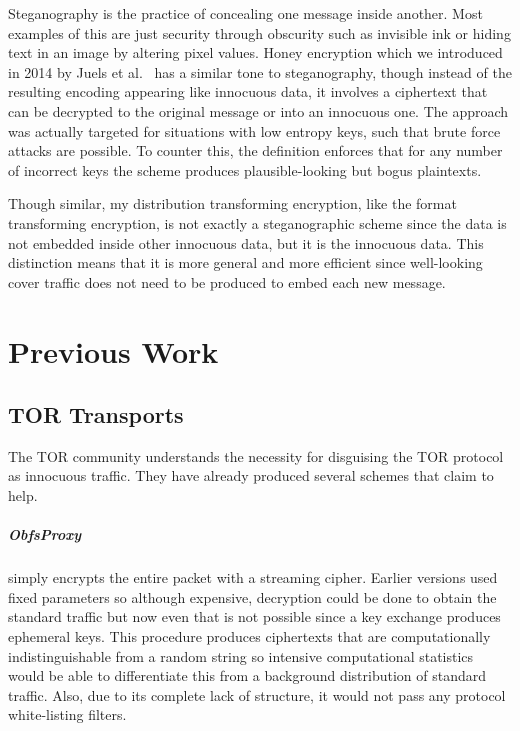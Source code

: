 \documentclass[ %
                    author={Samuel Russell},
                supervisor={Prof. Bogdan Warinschi},
                    degree={MEng},
                     title={Innocuous Ciphertexts},
                  subtitle={The DE-CENSOR Scheme},
                      type={Research},
                      year={2018} ]{dissertation}
\begin{document}
Steganography is the practice of concealing one message inside another.
Most examples of this are just security through obscurity such as invisible ink or hiding text in an image by altering pixel values.
Honey encryption which we introduced in 2014 by Juels et al.~\cite{honey} has a similar tone to steganography, though instead of the resulting encoding appearing like innocuous data, it involves a ciphertext that can be decrypted to the original message or into an innocuous one.
The approach was actually targeted for situations with low entropy keys, such that brute force attacks are possible. To counter this, the definition enforces that for any number of incorrect keys the scheme produces plausible-looking but bogus plaintexts.

Though similar, my distribution transforming encryption, like the format transforming encryption, is not exactly a steganographic scheme since the data is not embedded inside other innocuous data, but it is the innocuous data. This distinction means that it is more general and more efficient since well-looking cover traffic does not need to be produced to embed each new message.


\chapter{Previous Work}\label{prev_work}

\section{TOR Transports}

The TOR community understands the necessity for disguising the TOR protocol as innocuous traffic.
They have already produced several schemes that claim to help.

\paragraph{ObfsProxy} simply encrypts the entire packet with a streaming cipher. Earlier versions used fixed parameters so although expensive, decryption could be done to obtain the standard traffic but now even that is not possible since a key exchange produces ephemeral keys. This procedure produces ciphertexts that are computationally indistinguishable from a random string so intensive computational statistics would be able to differentiate this from a background distribution of standard traffic. Also, due to its complete lack of structure, it would not pass any protocol white-listing filters.
\end{document}
